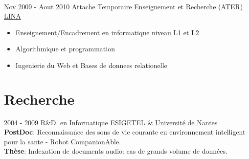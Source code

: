 \documentclass[letterpaper]{twentysecondcv} %
\begin{document}
\begin{twenty}
       \\
	\twentyitem
	{Nov 2009 -}
	{Aout 2010}
	{Attache Temporaire Enseignement et Recherche (ATER)}
	{\href{http://www.lina.univ-nantes.fr/}{LINA}}
	{}
	{
		\begin{itemize}
			\item Enseignement/Encadrement en informatique niveau L1 et L2
			\item Algorithmique et programmation
			\item Ingenierie du Web et Bases de donnees relationelle
		\end{itemize}
	}
\end{twenty}

\section{Recherche}
\begin{twenty}
	\twentyitem
    	{2004 - 2009}
		{}
        {R\&D. en Informatique}
        {\href{https://www.univ-nantes.fr/}{ESIGETEL \& Université de Nantes}}
        {}
	       {
	        \textbf{PostDoc}: Reconnaissance des sons de vie courante en environnement intelligent pour la sante - Robot CompanionAble. \\
	       	\textbf{Thèse}: Indexation de documents audio: cas de grands volume de données.
	        {
			}
	       }
  
\end{twenty}

\end{document}
